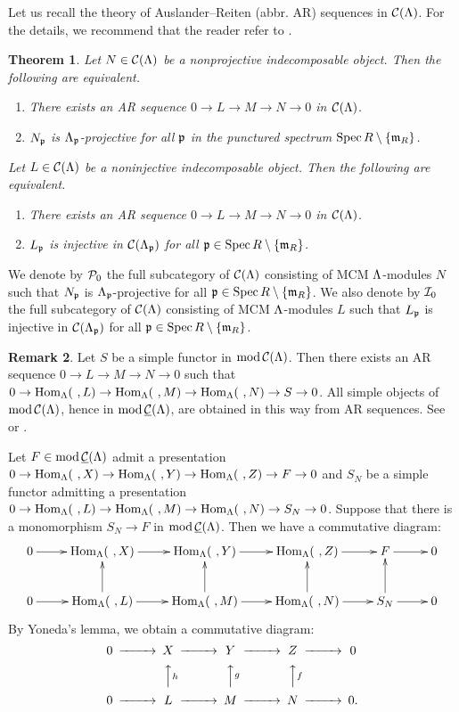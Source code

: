\documentclass[11pt]{amsart}
\newtheorem{theorem}{Theorem}[section]
\theoremstyle{definition}
\newtheorem{remark}[theorem]{Remark}
\numberwithin{equation}{section}
\begin{document}
Let us recall the theory of Auslander--Reiten (abbr. AR) sequences in ${\mathcal C}(\Lambda )$. 
For the details, we recommend that the reader refer to \cite{AR87, I08, LW12, Y}. 

\begin{theorem}\cite{AR87, Nak22}
Let $N \in {\mathcal C}(\Lambda )$ be a nonprojective indecomposable object.
Then the following are equivalent. 
\begin{enumerate}[\rm(1)]
\item There exists an AR sequence $0 \to L \to M \to N \to 0$ in ${\mathcal C}(\Lambda )$. 
\item $N_{\mathfrak p}$ is $\Lambda_\mathfrak p$-projective for all $\mathfrak p$ in the punctured spectrum $\mathrm{Spec}\, R \setminus \{ \mathfrak m_R \}$. 
\end{enumerate}
Let $L \in {\mathcal C}(\Lambda )$ be a noninjective indecomposable object.
Then the following are equivalent. 
\begin{enumerate}[\rm(1')]
\item There exists an AR sequence $0 \to L \to M \to N \to 0$ in ${\mathcal C}(\Lambda )$. 
\item $L_{\mathfrak p}$ is injective in $\mathcal C (\Lambda_{\mathfrak p})$ for all $\mathfrak p \in \mathrm{Spec}\, R \setminus \{\mathfrak m_R \}$. 
\end{enumerate} 
\end{theorem}

We denote by $\mathcal P_0$ the full subcategory of ${\mathcal C}(\Lambda )$ consisting of MCM $\Lambda$-modules $N$ such that $N_{\mathfrak p}$ is $\Lambda_\mathfrak p$-projective for all $\mathfrak p \in \mathrm{Spec}\, R \setminus \{ \mathfrak m_R \}$. 
We also denote by $\mathcal I_0$ the full subcategory of ${\mathcal C}(\Lambda )$ consisting of MCM $\Lambda$-modules $L$ such that $L_{\mathfrak p}$ is injective in $\mathcal C (\Lambda_{\mathfrak p})$ for all $\mathfrak p \in \mathrm{Spec}\, R \setminus \{\mathfrak m_R \}$. 

\begin{remark}\label{B3}
Let $S$ be a simple functor in ${\mathrm{mod}}\,{\mathcal C}(\Lambda )$. 
Then there exists an AR sequence $0 \to L \to M \to N \to 0$ such that $0 \to \mathrm{Hom}_\Lambda (\   , L) \to \mathrm{Hom}_\Lambda (\   , M) \to \mathrm{Hom}_\Lambda (\   , N) \to S \to 0$. 
All simple objects of ${\mathrm{mod}}\,{\mathcal C}(\Lambda )$, hence in ${\mathrm{mod}}\,\underline{{\mathcal C}}(\Lambda )$,  are obtained in this way from AR sequences. 
See \cite[(4.12)]{Y} or \cite[Proposition 2.3]{E19}. 
\end{remark}

Let $F \in {\mathrm{mod}}\,\underline{{\mathcal C}}(\Lambda )$ admit a presentation $0 \to \mathrm{Hom}_\Lambda (\  , X) \to \mathrm{Hom}_\Lambda (\  , Y) \to \mathrm{Hom}_\Lambda (\   , Z) \to F \to 0$ and $S_N$ be a simple functor admitting a presentation $0 \to \mathrm{Hom}_\Lambda (\  , L) \to \mathrm{Hom}_\Lambda (\  , M) \to \mathrm{Hom}_\Lambda (\   , N) \to S_N \to 0$. 
Suppose that there is a monomorphism $S_N \to F$ in ${\mathrm{mod}}\,\underline{{\mathcal C}}(\Lambda )$. 
Then we have a commutative diagram: 
$$
\xymatrix{
0 \ar[r] & \HomL(\ ,X) \ar[r] & \HomL(\ ,Y) \ar[r] & \HomL(\ ,Z) \ar[r] & F \ar[r] & 0 \\
0 \ar[r] & \HomL(\ ,L) \ar[r] \ar[u] & \HomL(\ ,M) \ar[r] \ar[u] & \HomL(\ ,N) \ar[r] \ar[u] & S_N \ar[r] \ar[u] & 0
}
$$
By Yoneda's lemma, we obtain a commutative diagram:
$$
\begin{CD}
0 @>>>X @>>> Y @>>> Z @>>> 0 \\
@. @AA{h}A @AA{g}A @AA{f}A  @. \\
0 @>>> L @>>> M @>>> N @>>> 0.  
\end{CD}
$$
\end{document}
